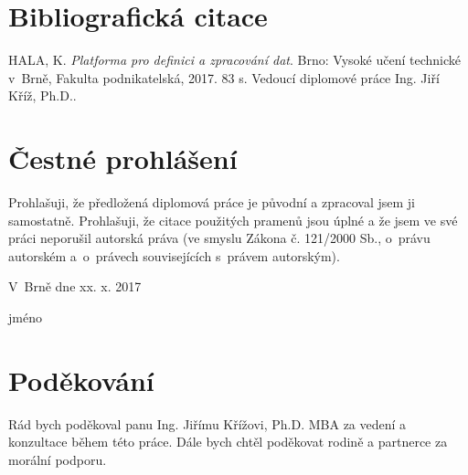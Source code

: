 \documentclass[12pt,oneside,a4paper]{report}
\newcommand{\blank}[1]{\hspace*{#1}}
\begin{document}
\newpage
\hbox{}
\vfill

\section*{Bibliografická citace}
HALA, K. \textit{Platforma pro definici a zpracování dat}. Brno: Vysoké učení technické v~Brně, Fakulta podnikatelská, 2017. 83 s. Vedoucí diplomové práce Ing. Jiří Kříž, Ph.D..
\vskip1cm

\newpage
\hbox{}
\vfill

\section*{Čestné prohlášení}
Prohlašuji, že předložená diplomová práce je původní a zpracoval jsem ji samostatně. Prohlašuji, že citace použitých pramenů jsou úplné a že jsem ve své práci neporušil autorská práva (ve smyslu Zákona č. 121/2000 Sb., o~právu autorském a~o~právech souvisejících s~právem autorským).
\\
\par V~Brně dne xx. x. 2017 %
\hfill\dotuline{\blank{5cm}}\hskip2cm
\par\hfill jméno \hskip5cm\blank{-4cm}
\vskip1cm

\newpage
\hbox{}
\vfill

\section*{Poděkování}
Rád bych poděkoval panu Ing. Jiřímu Křížovi, Ph.D. MBA za vedení a konzultace během této práce. Dále bych chtěl poděkovat rodině a partnerce za morální podporu.
\vskip1cm
\end{document}
